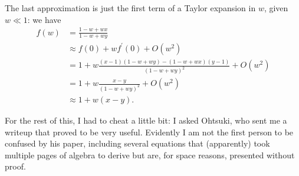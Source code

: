 \documentclass[14pt, justified]{tufte-handout}
\begin{document}
The last approximation is just the first term of a Taylor expansion in $w$, given $w \ll 1$: we have
\begin{equation}
    \begin{split}
        f(w) & = \frac{1 - w + wx}{1 - w + wy}
        \\
        & \approx f(0) + w f^\prime(0) + O(w^2)
        \\
        & = 1 + w \frac{(x - 1)(1 - w + wy) - (1 - w + wx)(y - 1)}{(1 - w + wy)^2} + O(w^2)
        \\
        & = 1 + w \frac{x - y}{(1 - w + wy)^2} + O(w^2)
        \\
        & \approx 1 + w(x-y).
    \end{split}
\end{equation}

For the rest of this, I had to cheat a little bit: I asked Ohtsuki, who sent me a writeup that proved to be very useful.
Evidently I am not the first person to be confused by his paper, including several equations that (apparently) took multiple pages of algebra to derive but are, for space reasons, presented without proof.
\end{document}
